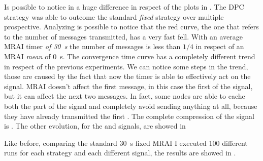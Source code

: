 Is possible to notice in  a huge difference
in respect of the plots in .
The \ac{DPC} strategy was able to outcome the standard \textit{fixed} strategy
over multiple prospective.
Analyzing  is possible to notice that
the red curve, the one that refers to the number of messages transmitted, has
a very fast fell.
With an average \ac{MRAI} timer \textit{of \SI{30}{\second}}
the number of messages is less than $1/4$ in respect of an \ac{MRAI} \textit{mean}
of \SI{0}{\second}.
The convergence time curve has a completely different trend in respect of the
previous experiments.
We can notice some steps in the trend, those are caused by the fact that
now the timer is able to effectively act on the signal.
\ac{MRAI} doesn't affect the first message, in this case the first  of the
signal, but it can affect the next two messages.
In fact, some nodes are able to cache both the  part of the signal and
completely avoid sending anything at all, because they have already transmitted
the first .
The complete compression of the signal  is .
The other evolution, for the  and  signals, are showed in

Like before, comparing the standard \SI{30}{\second} fixed \ac{MRAI} I executed
\num{100} different runs for each strategy and each different signal, the results
are showed in .

